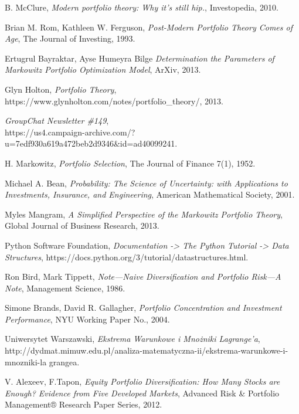 \documentclass[magister]{dyplom}
\begin{document}
\begin{thebibliography}{30}
	B. McClure,
	\emph{Modern portfolio theory: Why it’s still hip.},
	Investopedia, 2010.
	
	Brian M. Rom, Kathleen W. Ferguson,
	\emph{Post-Modern Portfolio Theory Comes of Age},
	The Journal of Investing, 1993.

	Ertugrul Bayraktar, Ayse Humeyra Bilge
	\emph{Determination the Parameters of Markowitz Portfolio Optimization Model},
	ArXiv, 2013.

	Glyn Holton,
	\emph{Portfolio Theory},
	https://www.glynholton.com/notes/portfolio\_theory/, 2013.

	\emph{GroupChat Newsletter \#149},\\
	https://us4.campaign-archive.com/?u=7edf930a619a472beb2d9346\&id=ad40099241.

	H. Markowitz,
	\emph{Portfolio Selection},
	The Journal of Finance 7(1), 1952.
	
	Michael A. Bean,
	\emph{Probability: The Science of Uncertainty: with Applications to Investments, Insurance, and Engineering},
	American Mathematical Society, 2001.

	Myles Mangram,
	\emph{A Simplified Perspective of the Markowitz Portfolio Theory},
	Global Journal of Business Research, 2013.
	
	Python Software Foundation,
	\emph{Documentation -> The Python Tutorial -> Data Structures},
	https://docs.python.org/3/tutorial/datastructures.html.
		
	Ron Bird, Mark Tippett,
	\emph{Note---Naive Diversification and Portfolio Risk---A Note},
	Management Science, 1986.

	Simone Brands, David R. Gallagher,
	\emph{Portfolio Concentration and Investment Performance},
	NYU Working Paper No., 2004.

	Uniwersytet Warszawski,
	\emph{Ekstrema Warunkowe i Mnożniki Lagrange'a},
	http://dydmat.mimuw.edu.pl/analiza-matematyczna-ii/ekstrema-warunkowe-i-mnozniki-la\newline
	grangea.

	V. Alexeev, F.Tapon,
	\emph{Equity Portfolio Diversification: How Many Stocks are Enough? Evidence from Five Developed Markets},
	Advanced Risk \& Portfolio Management® Research Paper Series, 2012.


\end{thebibliography}
\end{document}
